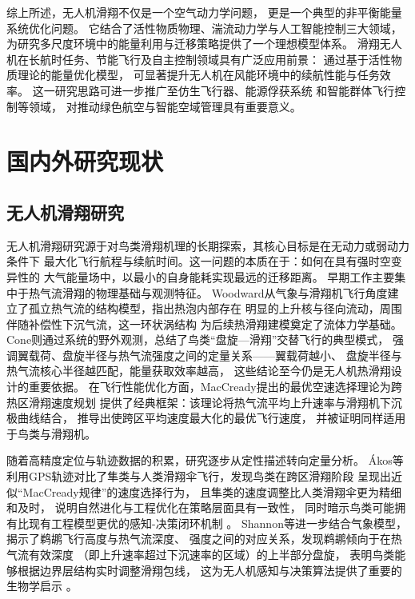 综上所述，无人机滑翔不仅是一个空气动力学问题，
更是一个典型的非平衡能量系统优化问题。
它结合了活性物质物理、湍流动力学与人工智能控制三大领域，
为研究多尺度环境中的能量利用与迁移策略提供了一个理想模型体系。
滑翔无人机在长航时任务、节能飞行及自主控制领域具有广泛应用前景：
通过基于活性物质理论的能量优化模型，
可显著提升无人机在风能环境中的续航性能与任务效率。
这一研究思路可进一步推广至仿生飞行器、能源俘获系统
和智能群体飞行控制等领域，
对推动绿色航空与智能空域管理具有重要意义。
\section{国内外研究现状}

\subsection{无人机滑翔研究}

无人机滑翔研究源于对鸟类滑翔机理的长期探索，其核心目标是在无动力或弱动力条件下
最大化飞行航程与续航时间。这一问题的本质在于：如何在具有强时空变异性的
大气能量场中，以最小的自身能耗实现最远的迁移距离。
早期工作主要集中于热气流滑翔的物理基础与观测特征。
Woodward从气象与滑翔机飞行角度建立了孤立热气流的结构模型，指出热泡内部存在
明显的上升核与径向流动，周围伴随补偿性下沉气流，这一环状涡结构
为后续热滑翔建模奠定了流体力学基础\cite{woodwardTheoryThermalSoaring1956}。
Cone则通过系统的野外观测，总结了鸟类“盘旋—滑翔”交替飞行的典型模式，
强调翼载荷、盘旋半径与热气流强度之间的定量关系——翼载荷越小、
盘旋半径与热气流核心半径越匹配，能量获取效率越高，
这些结论至今仍是无人机热滑翔设计的重要依据\cite{coneThermalSoaringBirds1962}。
在飞行性能优化方面，MacCready提出的最优空速选择理论为跨热区滑翔速度规划
提供了经典框架：该理论将热气流平均上升速率与滑翔机下沉极曲线结合，
推导出使跨区平均速度最大化的最优飞行速度，
并被证明同样适用于鸟类与滑翔机\cite{maccreadyOptimumAirspeedSelector1958}。

随着高精度定位与轨迹数据的积累，研究逐步从定性描述转向定量分析。
Ákos等利用GPS轨迹对比了隼类与人类滑翔伞飞行，发现鸟类在跨区滑翔阶段
呈现出近似“MacCready规律”的速度选择行为，
且隼类的速度调整比人类滑翔伞更为精细和及时，
说明自然进化与工程优化在策略层面具有一致性，
同时暗示鸟类可能拥有比现有工程模型更优的感知-决策闭环机制
\cite{akosComparingBirdHuman2008}。
Shannon等进一步结合气象模型，揭示了鹈鹕飞行高度与热气流深度、
强度之间的对应关系，发现鹈鹕倾向于在热气流有效深度
（即上升速率超过下沉速率的区域）的上半部分盘旋，
表明鸟类能够根据边界层结构实时调整滑翔包线，
这为无人机感知与决策算法提供了重要的生物学启示
\cite{shannonAmericanWhitePelican2002a}。

